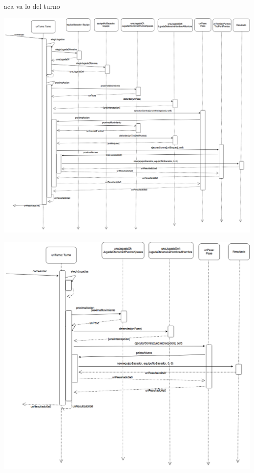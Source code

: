 aca va lo del turno

\begin{center}
  \includegraphics[scale=0.25]{imagenes/turno-pase-y-tiro-exitosos.png}
\end{center}

\begin{center}
  \includegraphics[scale=0.25]{imagenes/turno-pase-afuera.png}
\end{center}
